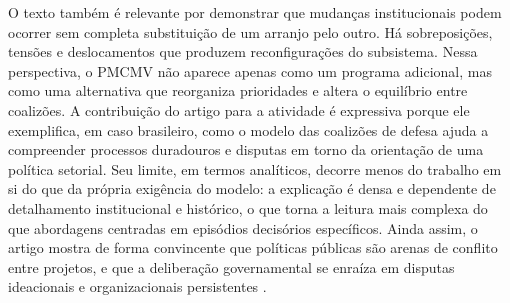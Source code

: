 \documentclass[12pt,a4paper]{article}
\begin{document}
O texto também é relevante por demonstrar que mudanças institucionais podem ocorrer sem completa substituição de um arranjo pelo outro. Há sobreposições, tensões e deslocamentos que produzem reconfigurações do subsistema. Nessa perspectiva, o PMCMV não aparece apenas como um programa adicional, mas como uma alternativa que reorganiza prioridades e altera o equilíbrio entre coalizões.
A contribuição do artigo para a atividade é expressiva porque ele exemplifica, em caso brasileiro, como o modelo das coalizões de defesa ajuda a compreender processos duradouros e disputas em torno da orientação de uma política setorial. Seu limite, em termos analíticos, decorre menos do trabalho em si do que da própria exigência do modelo: a explicação é densa e dependente de detalhamento institucional e histórico, o que torna a leitura mais complexa do que abordagens centradas em episódios decisórios específicos. Ainda assim, o artigo mostra de forma convincente que políticas públicas são arenas de conflito entre projetos, e que a deliberação governamental se enraíza em disputas ideacionais e organizacionais persistentes \autocite{ferreira2019habitacional}.
\end{document}
